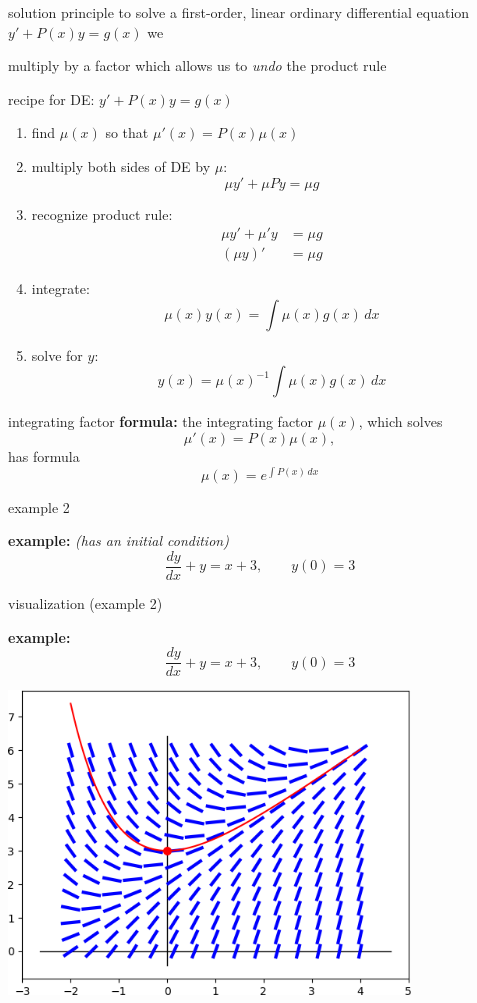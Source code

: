 \documentclass{beamer}
\begin{document}
\begin{frame}{solution principle}
to solve a first-order, linear ordinary differential equation $y' + P(x) y = g(x)$ we

 \alert{multiply by a factor which allows us to \emph{undo} the product rule}
\end{frame}


\begin{frame}{recipe}
for DE: \qquad $y' + P(x) y = g(x)$

\bigskip
\begin{enumerate}
\item find $\mu(x)$ so that $\mu'(x) = P(x) \mu(x)$
\item multiply both sides of DE by $\mu$:
    $$\mu y' + \mu P y = \mu g$$
\item recognize product rule:
\begin{align*}
\mu y' + \mu' y &= \mu g \\
(\mu y)' &= \mu g
\end{align*}
\item integrate:
    $$\mu(x) y(x) = \int \mu(x) g(x)\,dx$$
\item solve for $y$:
    $$y(x) = \mu(x)^{-1} \int \mu(x) g(x)\,dx$$
\end{enumerate}
\end{frame}


\begin{frame}{integrating factor}
\noindent \textbf{formula:}  the \alert{integrating factor} $\mu(x)$, which solves
    $$\mu'(x) = P(x) \mu(x),$$
has formula
    $$\mu(x) = e^{\int P(x)\,dx}$$
\end{frame}


\begin{frame}{example 2}

\textbf{example:}  \emph{(has an initial condition)}
        $$\frac{dy}{dx} + y = x+3, \qquad y(0)=3$$

\vspace{60mm}
\end{frame}


\begin{frame}{visualization (example 2)}

\textbf{example:}
        $$\frac{dy}{dx} + y = x+3, \qquad y(0)=3$$

\centering
\includegraphics[width=0.8\textwidth]{figs/lineardirfieldsoln}
\end{frame}
\end{document}
